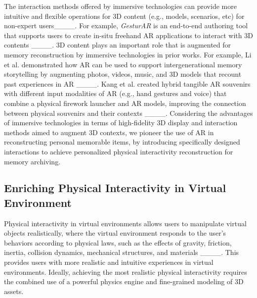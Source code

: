 The interaction methods offered by immersive technologies can provide more intuitive and flexible operations for 3D content (e.g., models, scenarios, etc) for non-expert users____. 
For example, \textit{GesturAR} is an end-to-end authoring tool that supports users to create in-situ freehand AR applications to interact with 3D contents ____.
3D content plays an important role that is augmented for memory reconstruction by immersive technologies in prior works. 
For example, Li et al. demonstrated how AR can be used to support intergenerational memory storytelling by augmenting photos, videos, music, and 3D models that recount past experiences in AR ____.
Kang et al. created hybrid tangible AR souvenirs with different input modalities of AR (e.g., hand gestures and voice) that combine a physical firework launcher and AR models, improving the connection between physical souvenirs and their contexts ____.
Considering the advantages of immersive technologies in terms of high-fidelity 3D display and interaction methods aimed to augment 3D contexts, we pioneer the use of AR in reconstructing personal memorable items, by introducing specifically designed interactions to achieve personalized physical interactivity reconstruction for memory archiving.




\subsection{Enriching Physical Interactivity in Virtual Environment}
Physical interactivity in virtual environments allows users to manipulate virtual objects realistically, where the virtual environment responds to the user's behaviors according to physical laws, such as the effects of gravity, friction, inertia, collision dynamics, mechanical structures, and materials ____. This provides users with more realistic and intuitive experiences in virtual environments.
Ideally, achieving the most realistic physical interactivity requires the combined use of a powerful physics engine and fine-grained modeling of 3D assets.

